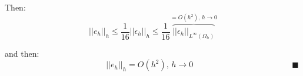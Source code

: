 Then:
\begin{equation*}
||e_h||_h \le \frac{1}{16} ||\epsilon_h||_h \le \frac{1}{16} \overbrace{||\epsilon_h||_{L^\infty(\Omega_h)}}^{= O(h^2), \, h \rightarrow 0}
\end{equation*}

and then:
\begin{equation*}
\qquad\qquad\qquad\qquad\qquad\qquad ||e_h||_h = O(h^2), \, h \rightarrow 0   \qquad\qquad\qquad\qquad\qquad\qquad \blacksquare
\end{equation*}


